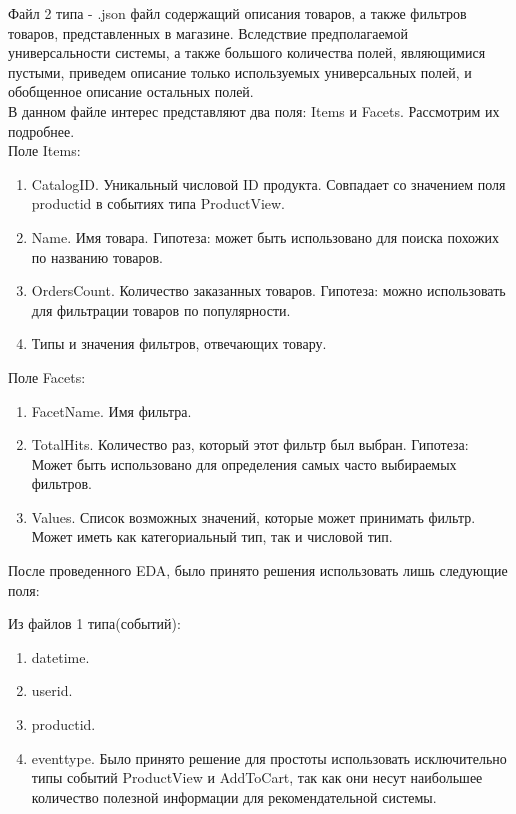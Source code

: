 \documentclass[14pt]{mmcs_article}
\newenvironment{myenumerate}
{ \begin{enumerate}
		\setlength{\itemsep}{0pt}
		\setlength{\parskip}{0pt}
		\setlength{\parsep}{0pt}     }
	{ \end{enumerate}                  }
\begin{document}
Файл 2 типа - .json файл содержащий описания товаров, а также фильтров товаров, представленных в магазине. Вследствие предполагаемой универсальности системы, а также большого количества полей, являющимися пустыми, приведем описание только используемых универсальных полей, и обобщенное описание остальных полей.\\
В данном файле интерес представляют два поля: Items и Facets. Рассмотрим их подробнее. \\
Поле Items:
\begin{myenumerate}
	
	\item CatalogID. Уникальный числовой ID продукта. Совпадает со значением поля productid в событиях типа ProductView.
	\item Name. Имя товара. Гипотеза: может быть использовано для поиска похожих по названию товаров.
 	\item OrdersCount. Количество заказанных товаров. Гипотеза: можно использовать для фильтрации товаров по популярности.
	\item Типы и значения фильтров, отвечающих товару.
\end{myenumerate}

Поле Facets:
\begin{myenumerate}
	
	\item FacetName. Имя фильтра.
	\item TotalHits. Количество раз, который этот фильтр был выбран. Гипотеза: Может быть использовано для определения самых часто выбираемых фильтров.
	\item Values. Список возможных значений, которые может принимать фильтр. Может иметь как категориальный тип, так и числовой тип. 
\end{myenumerate}

После проведенного EDA, было принято решения использовать лишь следующие поля:

Из файлов 1 типа(событий):

\begin{myenumerate}
		\item datetime.
		\item userid. 
		\item productid.
		\item eventtype. Было принято решение для простоты использовать исключительно типы событий ProductView и AddToCart, так как они несут наибольшее количество полезной информации для рекомендательной системы. 
\end{myenumerate}
\end{document}
